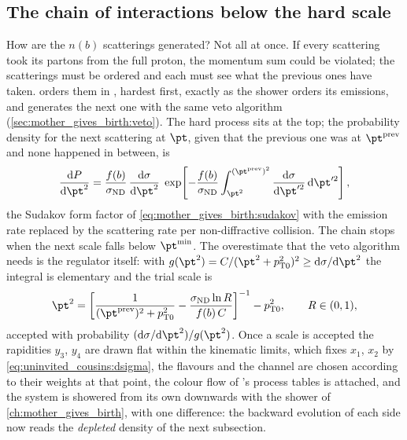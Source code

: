 \subsection{The chain of interactions below the hard scale}
\label{sec:uninvited_cousins:chain}

How are the $n(b)$ scatterings generated? Not all at once. If every
scattering took its partons from the full proton, the momentum sum could be
violated; the scatterings must be ordered and each must see what the
previous ones have taken. \PYTHIA orders them in \pt, hardest first, exactly
as the shower orders its emissions, and generates the next one with the
same veto algorithm (\cref{sec:mother_gives_birth:veto}). The hard process
sits at the top; the probability density for the next scattering at
$\pt$, given that the previous one was at $\pt^{\mathrm{prev}}$ and none
happened in between, is
\begin{equation}
  \frac{\mathrm{d}P}{\mathrm{d}\pt^2}=\frac{f(b)}{\signd}\,\frac{\mathrm{d}\sigma}{\mathrm{d}\pt^2}\;
  \exp\!\left[-\frac{f(b)}{\signd}\int_{\pt^2}^{(\pt^{\mathrm{prev}})^2}\frac{\mathrm{d}\sigma}{\mathrm{d}\pt'^2}\,\mathrm{d}\pt'^2\right],
  \label{eq:uninvited_cousins:chain}
\end{equation}
the Sudakov form factor of \cref{eq:mother_gives_birth:sudakov} with the
emission rate replaced by the scattering rate per non-diffractive collision.
The chain stops when the next scale falls below $\pt^{\min}$. The
overestimate that the veto algorithm needs is the regulator itself: with
$g(\pt^2)=C/(\pt^2+\ptzero^2)^2\ge\mathrm{d}\sigma/\mathrm{d}\pt^2$ the
integral is elementary and the trial scale is
\begin{equation}
  \pt^2=\left[\frac{1}{(\pt^{\mathrm{prev}})^2+\ptzero^2}-\frac{\signd\ln R}{f(b)\,C}\right]^{-1}-\ptzero^2,
  \qquad R\in(0,1),
  \label{eq:uninvited_cousins:trial}
\end{equation}
accepted with probability $(\mathrm{d}\sigma/\mathrm{d}\pt^2)/g(\pt^2)$.
Once a scale is accepted the rapidities $y_3$, $y_4$ are drawn flat within
the kinematic limits, which fixes $x_1$, $x_2$ by
\cref{eq:uninvited_cousins:dsigma}, the flavours and the channel are
chosen according to their weights at that point, the colour flow of
\PYTHIA's process tables is attached, and the system is showered from its
own \pt downwards with the shower of \cref{ch:mother_gives_birth}, with one
difference: the backward evolution of each side now reads the
\emph{depleted} density of the next subsection.

